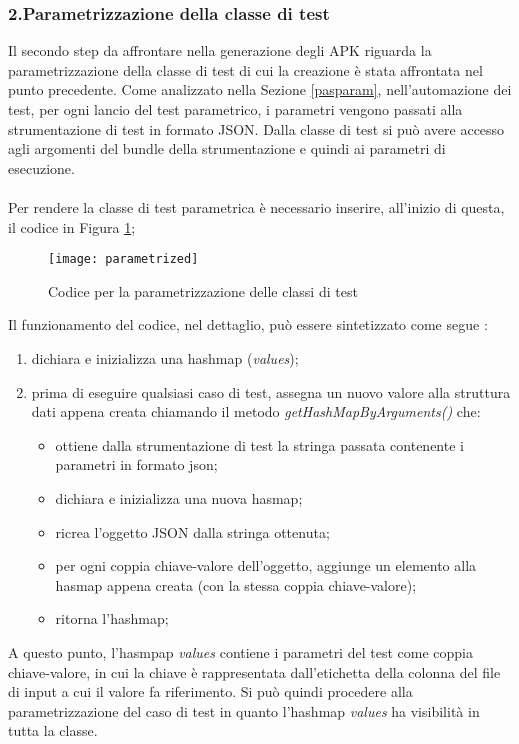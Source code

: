 \subsubsection*{2.Parametrizzazione della classe di test}
\label{paramclasstest}
Il secondo step da affrontare nella generazione degli APK riguarda la parametrizzazione della classe di test di cui la creazione è stata affrontata nel punto precedente. Come analizzato nella Sezione \ref{pasparam}, nell'automazione dei test, per ogni lancio del test parametrico, i parametri vengono passati  alla strumentazione di test in formato JSON. Dalla classe di test si può avere accesso agli argomenti del bundle della strumentazione e quindi ai parametri di esecuzione.
\\\\
\noindent Per rendere la classe di test parametrica è necessario inserire, all'inizio di questa, il codice in Figura \ref{fig:parametrized};

\begin{figure}[H]
	\texttt{[image: parametrized]}
	\centering
	\caption{Codice per la parametrizzazione delle classi di test}
    \label{fig:parametrized}
\end{figure}

\noindent Il funzionamento del codice, nel dettaglio, può essere sintetizzato come segue :
\begin{enumerate}[nosep]
\item dichiara e inizializza una hashmap (\emph{values});
\item prima di eseguire qualsiasi caso di test, assegna un nuovo valore alla struttura dati appena creata chiamando il metodo \emph{getHashMapByArguments()} che:
\begin{itemize} [nosep]
\item[1.] ottiene dalla strumentazione di test la stringa passata contenente i parametri in formato json;
\item[2.] dichiara e inizializza una nuova hasmap;
\item[3.] ricrea l'oggetto JSON dalla stringa ottenuta;
\item[4.] per ogni coppia chiave-valore dell'oggetto, aggiunge un elemento alla hasmap appena creata (con la stessa coppia chiave-valore);
\item[4.] ritorna l'hashmap;
\end{itemize}
\end{enumerate}
\bigskip
\noindent A questo punto, l'hasmpap \emph{values} contiene i parametri del test come coppia chiave-valore, in cui la chiave è rappresentata dall'etichetta della colonna del file di input a cui il valore fa riferimento. Si può quindi procedere alla parametrizzazione del caso di test in quanto l'hashmap \emph{values}  ha visibilità in tutta la classe.

